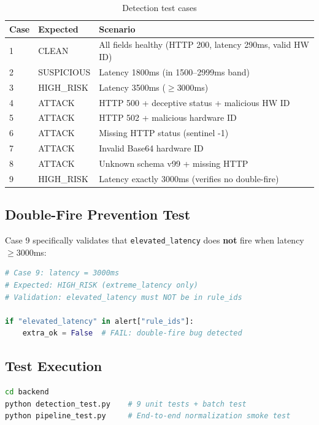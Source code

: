 \documentclass[12pt,a4paper]{article}
\begin{document}
\begin{table}[H]
\centering
\begin{tabularx}{\linewidth}{l l X}
\toprule
\textbf{Case} & \textbf{Expected} & \textbf{Scenario} \\
\midrule
1 & CLEAN & All fields healthy (HTTP 200, latency 290ms, valid HW ID) \\
2 & SUSPICIOUS & Latency 1800ms (in 1500--2999ms band) \\
3 & HIGH\_RISK & Latency 3500ms ($\geq$3000ms) \\
4 & ATTACK & HTTP 500 + deceptive status + malicious HW ID \\
5 & ATTACK & HTTP 502 + malicious hardware ID \\
6 & ATTACK & Missing HTTP status (sentinel -1) \\
7 & ATTACK & Invalid Base64 hardware ID \\
8 & ATTACK & Unknown schema v99 + missing HTTP \\
9 & HIGH\_RISK & Latency exactly 3000ms (verifies no double-fire) \\
\bottomrule
\end{tabularx}
\caption{Detection test cases}
\end{table}

\subsection{Double-Fire Prevention Test}

Case 9 specifically validates that \texttt{elevated\_latency} does \textbf{not} fire when latency $\geq$3000ms:

\begin{lstlisting}[language=Python, caption={Double-fire prevention validation}]
# Case 9: latency = 3000ms
# Expected: HIGH_RISK (extreme_latency only)
# Validation: elevated_latency must NOT be in rule_ids

if "elevated_latency" in alert["rule_ids"]:
    extra_ok = False  # FAIL: double-fire bug detected
\end{lstlisting}

\subsection{Test Execution}

\begin{lstlisting}[language=bash, caption={Running the test suite}]
cd backend
python detection_test.py    # 9 unit tests + batch test
python pipeline_test.py     # End-to-end normalization smoke test
\end{lstlisting}
\end{document}
